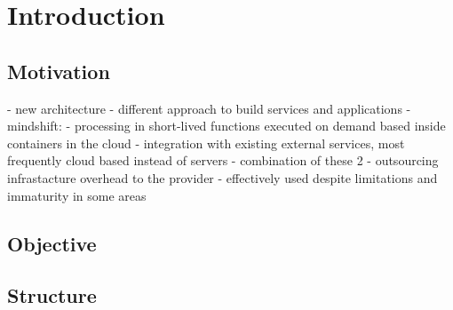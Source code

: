 \chapter{Introduction}

\section*{Motivation}

- new architecture - different approach to build services and applications
- mindshift:
  - processing in short-lived functions executed on demand based inside containers in the cloud
  - integration with existing external services, most frequently cloud based instead of servers
  - combination of these 2 - outsourcing infrastacture overhead to the provider
- effectively used despite limitations and immaturity in some areas

\section*{Objective}

\section*{Structure}